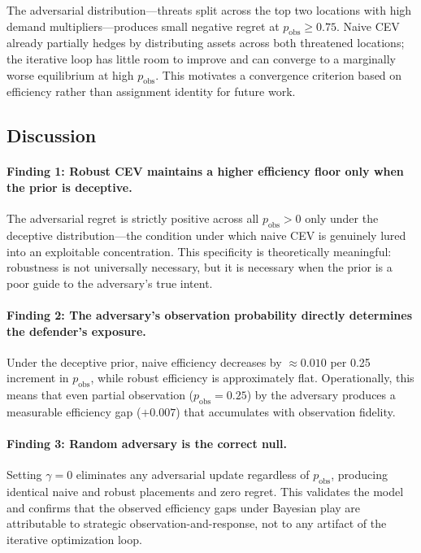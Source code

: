 \documentclass[11pt]{article}
\begin{document}
The adversarial distribution---threats split across the top two locations
with high demand multipliers---produces small negative regret at
$p_\mathrm{obs} \geq 0.75$.  Naive CEV already partially hedges by
distributing assets across both threatened locations; the iterative loop
has little room to improve and can converge to a marginally worse
equilibrium at high $p_\mathrm{obs}$.  This motivates a convergence
criterion based on efficiency rather than assignment identity for
future work.

\subsection{Discussion}
\label{sec:exp3:discussion}

\paragraph{Finding 1: Robust CEV maintains a higher efficiency floor
only when the prior is deceptive.}
The adversarial regret is strictly positive across all $p_\mathrm{obs} > 0$
only under the deceptive distribution---the condition under which naive
CEV is genuinely lured into an exploitable concentration.  This specificity
is theoretically meaningful: robustness is not universally necessary, but
it is necessary when the prior is a poor guide to the adversary's true
intent.

\paragraph{Finding 2: The adversary's observation probability directly
determines the defender's exposure.}
Under the deceptive prior, naive efficiency decreases by $\approx 0.010$
per 0.25 increment in $p_\mathrm{obs}$, while robust efficiency is
approximately flat.  Operationally, this means that even partial
observation ($p_\mathrm{obs} = 0.25$) by the adversary produces a
measurable efficiency gap ($+0.007$) that accumulates with observation
fidelity.

\paragraph{Finding 3: Random adversary is the correct null.}
Setting $\gamma = 0$ eliminates any adversarial update regardless of
$p_\mathrm{obs}$, producing identical naive and robust placements and
zero regret.  This validates the model and confirms that the observed
efficiency gaps under Bayesian play are attributable to strategic
observation-and-response, not to any artifact of the iterative
optimization loop.
\end{document}
